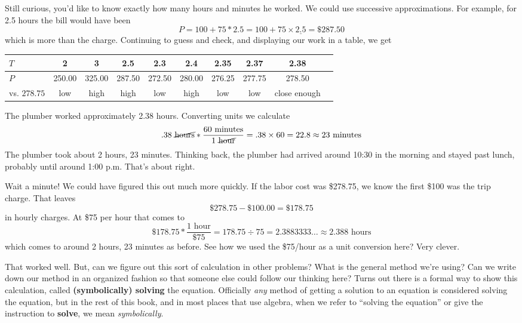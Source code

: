 Still curious, you'd like to know exactly how many hours and minutes he worked.  We could use successive approximations. %
For example, for 2.5 hours the bill would have been 
$$P=100 + 75 \ast 2.5 = 100+75\times \underline{2.5}=\$287.50$$ which is more than the charge. Continuing to guess and check, and displaying our work in a table, we get
\begin{center}
\begin{tabular} {|l| |c |c |c |c |c |c |c |c |c |} \hline
$T$ & 2 & 3 & 2.5 & 2.3 & 2.4 & 2.35 & 2.37 & 2.38\\ \hline
$P$ & 250.00 & 325.00 & 287.50 & 272.50 & 280.00 & 276.25 &277.75 &278.50 \\ \hline
vs. $278.75$& low & high & high & low & high & low & low & close enough\\ \hline
\end{tabular}
\end{center}

\noindent The plumber worked  approximately 2.38 hours.  
Converting units we calculate $$.38 \text{ \cancel{hours}} \ast  \frac{60 \text{ minutes}}{1 \text{ \cancel{hour}}} = .38 \times 60 = 22.8 \approx 23 \text{ minutes}$$  The plumber took about 2 hours, 23 minutes.  Thinking back, the plumber had arrived around 10:30 in the morning and stayed past lunch, probably until around 1:00 p.m. That's about right.

Wait a minute!  We could have figured this out much more quickly.  If the labor cost was \$278.75, we know the first \$100 was the trip charge.  That leaves $$\$278.75-\$100.00 = \$178.75$$ in hourly charges.  At \$75 per hour that comes to $$\$178.75\ast  \frac{\text{1 hour}}{\$75}=178.75 \div 75 = 2.3883333\ldots \approx 2.388 \text{ hours}$$ which comes to around 2 hours, 23 minutes as before.  See how we used the \$75/hour as a unit conversion here?  Very clever.

That worked well.  But, can we figure out this sort of calculation in other problems?  What is the general method we're using? Can we write down our method in an organized fashion so that someone else could follow our thinking here?  Turns out there is a formal way to show this calculation, called \textbf{(symbolically) solving} the equation. Officially \emph{any} method of getting a solution to an equation is considered solving the equation, but in the rest of this book, and in most places that use algebra, when we refer to ``solving the equation'' or give the instruction to \textbf{solve}, we mean \emph{symbolically}.

